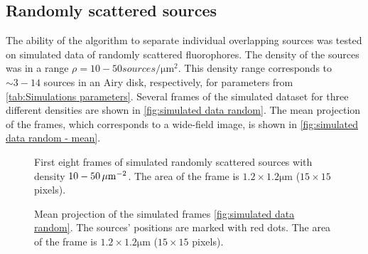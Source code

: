 \subsection{Randomly scattered sources\label{sub:Simul random}}
The ability of the algorithm to separate individual overlapping sources was tested on simulated data of randomly scattered fluorophores. The density of the sources was in a range $\rho=10-50 \unit{sources/\um^2}$. This density range corresponds to $\sim 3-14$ sources in an Airy disk, respectively, for parameters from \autoref{tab:Simulations parameters}. Several frames of the simulated dataset for three different densities are shown in  \autoref{fig:simulated data random}. The mean projection of the frames, which corresponds to a wide-field image, is shown in \autoref{fig:simulated data random - mean}.
%
\begin{figure}[!htb]	
	\newcommand{\widthfig}{1\textwidth}
	\centering	
	
	
	\caption{First eight frames of simulated randomly scattered sources with density $10-50\, \mathrm{\mu m}^{-2}$. The area of the frame is $1.2\times1.2\unit{\um}$ ($15\times15$ pixels).}
	\label{fig:simulated data random}
\end{figure} 
%
\begin{figure}[!tb]	
	\newcommand{\widthfig}{.3\textwidth}
	\centering	
	\hspace{.3cm}	
	\hspace{.3cm}	
	\caption{Mean projection of the simulated frames \autoref{fig:simulated data random}. The sources' positions are marked with red dots. The area of the frame is $1.2\times1.2\unit{\um}$ ($15\times15$ pixels).}
	\label{fig:simulated data random - mean}
\end{figure} 

\clearpage
